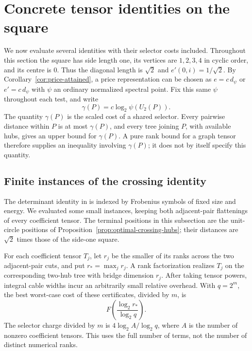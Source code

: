 \section{Concrete tensor identities on the square}\label{sec:identity-catalogue}
We now evaluate several identities with their selector costs included. Throughout this section the square has side length one, its vertices are $1,2,3,4$ in cyclic order, and its centre is $0$. Thus the diagonal length is $\sqrt2$ and $e'(0,i)=1/\sqrt2$. By Corollary~\ref{cor:price-attained}, a price representation can be chosen as $e=c\,d_\psi$ or $e'=c\,d_\psi$ with $\psi$ an ordinary normalized spectral point. Fix this same $\psi$ throughout each test, and write
\[
 \gamma(P)=c\log_2\psi(U_2(P)).
\]
The quantity $\gamma(P)$ is the scaled cost of a shared selector. Every pairwise distance within $P$ is at most $\gamma(P)$, and every tree joining $P$, with available hubs, gives an upper bound for $\gamma(P)$. A pure rank bound for a graph tensor therefore supplies an inequality involving $\gamma(P)$; it does not by itself specify this quantity.

\subsection{Finite instances of the crossing identity}
The determinant identity in \cite[Proposition B.2, pp.~23--24]{Anthropic2026} is indexed by Frobenius symbols of fixed size and energy. We evaluated some small instances, keeping both adjacent-pair flattenings of every coefficient tensor. The terminal positions in this subsection are the unit-circle positions of Proposition~\ref{prop:optimal-crossing-hubs}; their distances are $\sqrt2$ times those of the side-one square.

For each coefficient tensor $T_j$, let $r_j$ be the smaller of its ranks across the two adjacent-pair cuts, and put $r_* =\max_jr_j$. A rank factorization realizes $T_j$ on the corresponding two-hub tree with bridge dimension $r_j$. After taking tensor powers, integral cable widths incur an arbitrarily small relative overhead. With $q=2^m$, the best worst-case cost of these certificates, divided by $m$, is
\[
 F\!\left(\frac{\log_2r_*}{\log_2q}\right).
\]
The selector charge divided by $m$ is $4\log_2 A/\log_2 q$, where $A$ is the number of nonzero coefficient tensors. This uses the full number of terms, not the number of distinct numerical ranks.

